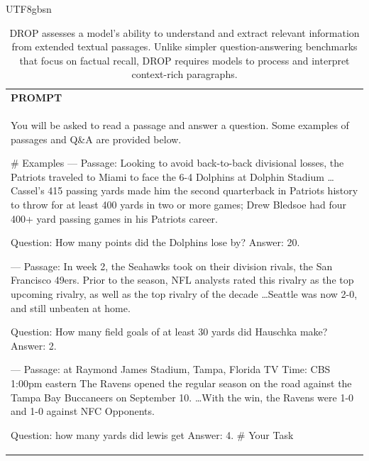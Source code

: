 \documentclass[11pt, a4paper, logo, copyright, nonumbering]{deepseek}
\begin{document}
\begin{CJK*}{UTF8}{gbsn}
\begin{table}[h]
    \centering \small
        \caption{DROP assesses a model's ability to understand and extract relevant information from extended textual passages. Unlike simpler question-answering benchmarks that focus on factual recall, DROP requires models to process and interpret context-rich paragraphs. }
    \label{tab:drop_eval_format_example}
    \begin{tabular}{p{}}
    \hline
    \textbf{PROMPT}\\
    You will be asked to read a passage and answer a question. Some examples of passages and Q\&A are provided below. 

\# Examples  
---
Passage:  Looking to avoid back-to-back divisional losses, the Patriots traveled to Miami to face the 6-4 Dolphins at Dolphin Stadium \ldots Cassel's 415 passing yards made him the second quarterback in Patriots history to throw for at least 400 yards in two or more games; Drew Bledsoe had four 400+ yard passing games in his Patriots career.

Question: How many points did the Dolphins lose by?
Answer: 20.

---
Passage:  In week 2, the Seahawks took on their division rivals, the San Francisco 49ers. Prior to the season, NFL analysts rated this rivalry as the top upcoming rivalry, as well as the top rivalry of the decade \ldots Seattle was now 2-0, and still unbeaten at home.

Question: How many field goals of at least 30 yards did Hauschka make?
Answer: 2.

---
Passage:  at Raymond James Stadium, Tampa, Florida TV Time: CBS 1:00pm eastern The Ravens opened the regular season on the road against the Tampa Bay Buccaneers on September 10. \ldots With the win, the Ravens were 1-0 and 1-0 against NFC Opponents.

Question: how many yards did lewis get
Answer: 4.
\# Your Task


\end{tabular}
\end{table}
\end{CJK*}
\end{document}
